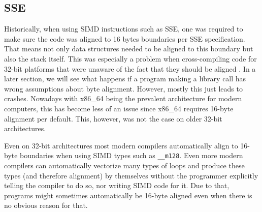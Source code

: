 \documentclass[a4paper,12pt]{scrartcl}
\begin{document}
\subsection{SSE}
Historically, when using SIMD instructions such as SSE, one was required to make sure the code
was aligned to 16 bytes boundaries per SSE specification. That means not only data structures
needed to be aligned to this boundary but also the stack itself. This was especially a problem when cross-compiling code for
32-bit platforms that were unaware of the fact that they should be aligned \cite{mingw-sse}. In a
later section, we will see what happens if a program making a library call has wrong assumptions
about byte alignment. However, mostly this just leads to crashes. Nowadays with x86\_64 being the
prevalent architecture for modern computers, this has become less of an issue since x86\_64
requires 16-byte alignment per default. This, however, was not the case on older 32-bit
architectures.

Even on 32-bit architectures most modern compilers automatically align to 16-byte boundaries when 
using SIMD types such as \verb|__m128|.
Even more modern compilers can automatically vectorize many types of loops and produce these types
(and therefore alignment) by themselves without the programmer explicitly telling the compiler to
do so, nor writing SIMD code for it. Due to that, programs might sometimes automatically be
16-byte aligned even when there is no obvious reason for that.
\end{document}

